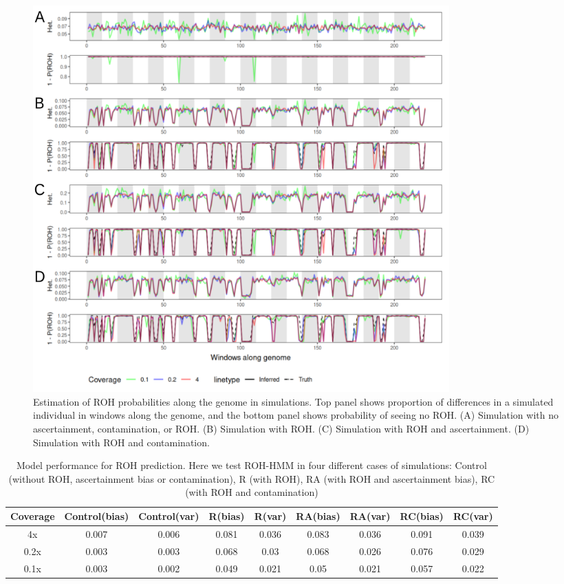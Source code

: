\documentclass[12pt, letterpaper]{article}
\begin{document}
\begin{figure}[h!]
    \includegraphics[width=16cm]{plots/inkscape_finalImg/ROHplot_final1.png}
    \centering
    \caption{Estimation of ROH probabilities along the genome in simulations. Top panel shows proportion of differences in a simulated individual in windows along the genome, and the bottom panel shows probability of seeing no ROH. (A) Simulation with no ascertainment, contamination, or ROH. (B) Simulation with ROH. (C) Simulation with ROH and ascertainment. (D) Simulation with ROH and contamination.}
    \label{fig2:ROH}
\end{figure}

\begin{table}[h!]
\caption{\label{tab:Table 2}Model performance for ROH prediction. Here we test ROH-HMM in four different cases of simulations: Control (without ROH, ascertainment bias or contamination), R (with ROH), RA (with ROH and ascertainment bias), RC (with ROH and contamination)}
\begin{tabular}{|c|c|c|c|c|c|c|c|c|}
    \hline
    Coverage & Control(bias) & Control(var) & R(bias) & R(var) & RA(bias) & RA(var) & RC(bias) & RC(var)\\
    \hline
    4x & 0.007 & 0.006 & 0.081 & 0.036 & 0.083 & 0.036 & 0.091 & 0.039\\
    \hline
    0.2x & 0.003 & 0.003 & 0.068 & 0.03 & 0.068 & 0.026 & 0.076 & 0.029\\
    \hline
    0.1x & 0.003 & 0.002 & 0.049 & 0.021 & 0.05 & 0.021 & 0.057 & 0.022\\
    \hline
\end{tabular}
\label{table1}
\end{table}
\end{document}
